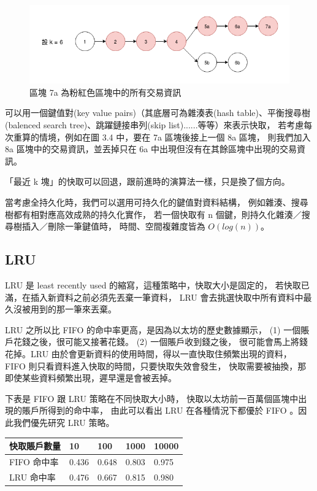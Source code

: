 \begin{figure}[h]
\includegraphics[width=\textwidth]{最近k塊}
\caption{區塊 7a 為粉紅色區塊中的所有交易資訊}
\end{figure}

可以用一個鍵值對(key value pairs)（其底層可為雜湊表(hash table)、平衡搜尋樹(balenced search tree)、跳躍鏈接串列(skip list)......等等）來表示快取，
若考慮每次重算的情境，例如在圖 3.4 中，要在 7a 區塊後接上一個 8a 區塊，
則我們加入 8a 區塊中的交易資訊，並丟掉只在 6a 中出現但沒有在其餘區塊中出現的交易資訊。

「最近 k 塊」的快取可以回退，跟前進時的演算法一樣，只是換了個方向。

當考慮全持久化時，我們可以選用可持久化的鍵值對資料結構，
例如雜湊\cite{bagwell2001ideal}\cite{puente2017persistence}、搜尋樹都有相對應高效成熟的持久化實作，
若一個快取有 n 個鍵，則持久化雜湊／搜尋樹插入／刪除一筆鍵值時，
時間、空間複雜度皆為 $O(log(n))$。

\subsection{LRU}

LRU 是 least recently used 的縮寫，這種策略中，快取大小是固定的，
若快取已滿，在插入新資料之前必須先丟棄一筆資料，
LRU 會去挑選快取中所有資料中最久沒被用到的那一筆來丟棄。

LRU 之所以比 FIFO 的命中率更高，是因為以太坊的歷史數據顯示，
(1) 一個賬戶花錢之後，很可能又接著花錢。 (2) 一個賬戶收到錢之後，
很可能會馬上將錢花掉。LRU 由於會更新資料的使用時間，得以一直快取住頻繁出現的資料，
FIFO 則只看資料進入快取的時間，只要快取失效會發生，
快取需要被抽換，那即使某些資料頻繁出現，遲早還是會被丟掉。

下表是 FIFO 跟 LRU 策略在不同快取大小時，
快取以太坊前一百萬個區塊中出現的賬戶所得到的命中率，
由此可以看出 LRU 在各種情況下都優於 FIFO 。因此我們優先研究 LRU 策略。

\begin{center}
\begin{tabular}{ | m{6em} | m{1cm}| m{1cm} | m{1cm} | m{1cm} | } 
\hline
快取賬戶數量& 10 & 100 & 1000 & 10000 \\ 
\hline
FIFO 命中率& 0.436 & 0.648 & 0.803 & 0.975 \\ 
\hline
LRU 命中率& 0.476 & 0.667 & 0.815 & 0.980\\ 
\hline
\end{tabular}
\end{center}


